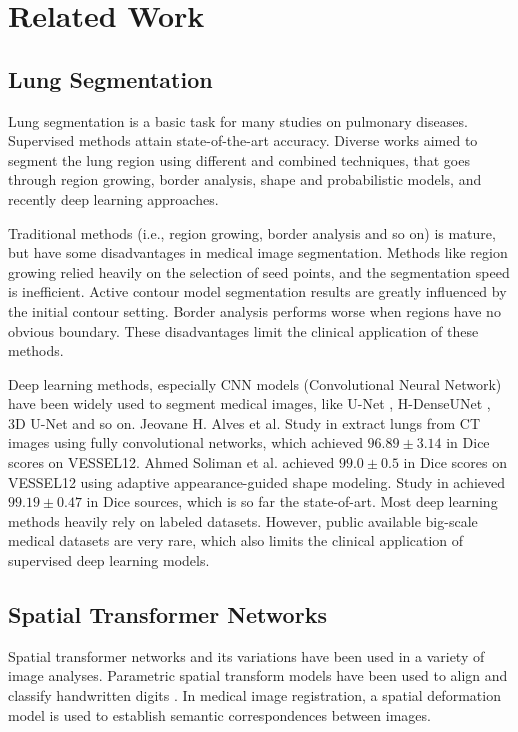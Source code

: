 \documentclass{article}
\begin{document}
\section{Related Work}
\label{sec:related}
\subsection{Lung Segmentation}
Lung segmentation is a basic task for many studies on pulmonary diseases. Supervised methods attain state-of-the-art accuracy. Diverse works aimed to segment the lung region using different and combined techniques, that goes through region growing, border analysis, shape and probabilistic models, and recently deep learning approaches. 

Traditional methods (i.e., region growing, border analysis and so on) is mature, but have some disadvantages in medical image segmentation.
Methods like region growing \cite{adams1994seeded} relied heavily on the selection of seed points, and the segmentation speed is inefficient.
Active contour model \cite{kass1988snakes} segmentation results are greatly influenced by the initial contour setting.
Border analysis \cite{canny1987computational} performs worse when regions have no obvious boundary. 
These disadvantages limit the clinical application of these methods.

Deep learning methods, especially CNN models (Convolutional Neural Network) have been widely used to segment medical images, like U-Net \cite{ronneberger2015u}, H-DenseUNet \cite{li2018h}, 3D U-Net \cite{cciccek20163d} and so on. Jeovane H. Alves et al. Study in \cite{alves2018extracting} extract lungs from CT images using fully
convolutional networks, which achieved $96.89 \pm 3.14$ in Dice scores on VESSEL12. Ahmed Soliman et al. \cite{soliman2016accurate} achieved $99.0 \pm 0.5$ in Dice scores on VESSEL12 using adaptive appearance-guided shape modeling. Study in \cite{alves2018extracting} achieved $99.19 \pm 0.47$ in Dice sources, which is so far the state-of-art. Most deep learning methods heavily rely on labeled datasets. However, public available big-scale medical datasets are very rare, which also limits the clinical application of supervised deep learning models.

\subsection{Spatial Transformer Networks}
Spatial transformer networks \cite{jaderberg2015spatial} and its variations have been used in a variety of image analyses. Parametric spatial transform models have been used to align and classify handwritten digits \cite{hauberg2016dreaming, learned2005data, miller2000learning}. In medical image registration, a spatial deformation model is used to establish semantic correspondences between images.
\end{document}
